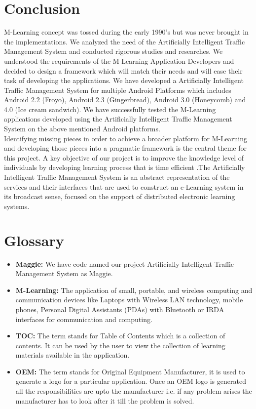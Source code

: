 \documentclass[openany,12pt]{report}
\begin{document}
\chapter{Conclusion}
\hspace*{0.5in}M-Learning concept was tossed during the early 1990's but was never brought in the implementations. We analyzed the need of the Artificially Intelligent Traffic Management System and conducted rigorous studies and researches. We understood the requirements of the M-Learning Application Developers and decided to design a framework which will match their needs and will ease their task of developing the applications. We have developed a Artificially Intelligent Traffic Management System for multiple Android Platforms which includes Android 2.2 (Froyo), Android 2.3 (Gingerbread), Android 3.0 (Honeycomb) and 4.0 (Ice cream sandwich). We have successfully tested the M-Learning applications developed using the Artificially Intelligent Traffic Management System on the above mentioned Android platforms.\\
\hspace*{0.5in}Identifying missing pieces in order to achieve a broader platform for M-Learning and developing those pieces into a pragmatic framework is the central theme for this project. A key objective of our project is to improve the knowledge level of individuals by developing learning process that is time efficient .The Artificially Intelligent Traffic Management System is an abstract representation of the services and their interfaces that are used to construct an e-Learning system in its broadcast sense, focused on the support of distributed electronic learning systems.

\appendix
\cleardoublepage
{}

\chapter{Glossary}
\begin{itemize}
\item{\textbf{Maggie:}} We have code named our project Artificially Intelligent Traffic Management System as Maggie.
\item{\textbf{M-Learning:}} The application of small, portable, and wireless computing and communication devices like Laptops with Wireless LAN technology, mobile phones, Personal Digital Assistants (PDAs) with Bluetooth or IRDA interfaces for communication and computing.
\item{\textbf {TOC:}} The term stands for Table of Contents which is a collection of contents. It can be used by the user to view the collection of learning materials available in the application.
\item{\textbf {OEM:}} The term stands for Original Equipment Manufacturer, it is used to generate a logo for a particular application. Once an OEM logo is generated all the responsibilities are upto the manufacturer i.e. if any problem arises the manufacturer has to look after it till the problem is solved.
\end{itemize}
\end{document}
